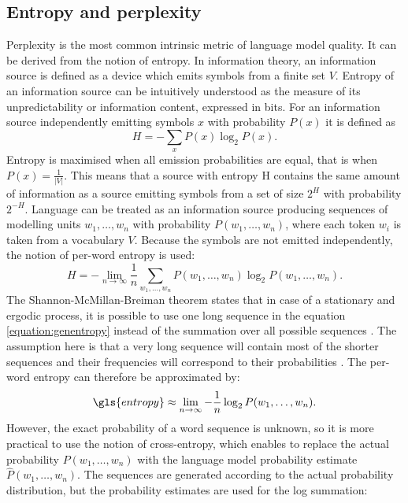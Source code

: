 	\subsection{Entropy and perplexity}
	\label{subsection:perplexity}
	Perplexity is the most common intrinsic metric of language model quality. It can be derived from the notion of entropy. In information theory, an information source is defined as a device which emits symbols from a finite set $V$. Entropy of an information source can be intuitively understood as the measure of its unpredictability or information content, expressed in bits. For an information source independently emitting symbols $x$ with probability $P(x)$ it is defined as
	\begin{equation}
		H=-\sum_{x}P(x)\log_{2}P(x).
		\label{equation:entropy}
	\end{equation}
	Entropy is maximised when all emission probabilities are equal, that is when $P(x)=\frac{1}{|V|}$. This means that a source with entropy H contains the same amount of information as a source emitting symbols from a set of size $2^{H}$ with probability $2^{-H}$.
	Language can be treated as an information source producing sequences of modelling units $w_{1}, \dots, w_{n}$ with probability $P(w_{1}, \dots, w_{n})$, where each token $w_{i}$ is taken from a vocabulary $V$. Because the symbols are not emitted independently, the notion of per-word entropy is used:
	\begin{equation}
		H=-\lim_{n\to\infty}\frac{1}{n}\sum_{w_{1}, \dots, w_{n}}P(w_{1}, \dots, w_{n})\log_{2}P(w_{1}, \dots, w_{n}).
		\label{equation:genentropy}
	\end{equation}
	The Shannon-McMillan-Breiman theorem states that in case of a stationary and ergodic process, it is possible to use one long sequence in the equation \ref{equation:genentropy} instead of the summation over all possible sequences \cite{algoet1988sandwich}. The assumption here is that a very long sequence will contain most of the shorter sequences and their frequencies will correspond to their probabilities \cite{jurafsky2000speech}. The per-word entropy can therefore be approximated by:
	\begin{equation}
		\gls{entropy}\approx\lim_{n\to\infty}-\frac{1}{n}\log_{2}P(w_{1}, \dots, w_{n}).
		\label{equation:approxentropy}
	\end{equation}
	However, the exact probability of a word sequence is unknown, so it is more practical to use the notion of cross-entropy, which enables to replace the actual probability $P(w_{1}, \dots, w_{n})$ with the language model probability estimate $\hat{P}(w_{1}, \dots, w_{n})$. The sequences are generated according to the actual probability distribution, but the probability estimates are used for the log summation:
